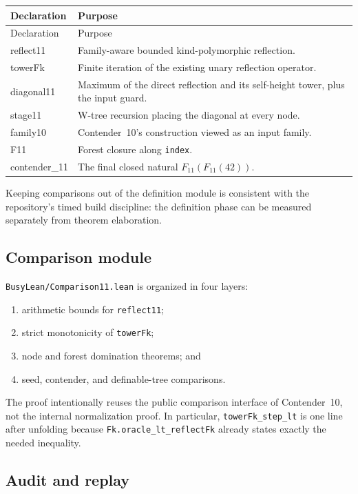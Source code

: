 \documentclass[11pt]{article}
\theoremstyle{definition}
\theoremstyle{remark}
\newcommand{\code}[1]{\texttt{#1}}
\begin{document}
\begin{longtable}{>{\ttfamily}p{} p{}}
\toprule
\normalfont Declaration & Purpose \\
\midrule
\endfirsthead
\toprule
\normalfont Declaration & Purpose \\
\midrule
\endhead
reflect11 & Family-aware bounded kind-polymorphic reflection. \\
towerFk & Finite iteration of the existing unary reflection operator. \\
diagonal11 & Maximum of the direct reflection and its self-height tower, plus the input guard. \\
stage11 & W-tree recursion placing the diagonal at every node. \\
family10 & Contender~10's construction viewed as an input family. \\
F11 & Forest closure along \code{index}. \\
contender\_11 & The final closed natural $F_{11}(F_{11}(42))$. \\
\bottomrule
\end{longtable}

Keeping comparisons out of the definition module is consistent with the
repository's timed build discipline: the definition phase can be measured
separately from theorem elaboration.

\subsection{Comparison module}

\code{BusyLean/Comparison11.lean} is organized in four layers:

\begin{enumerate}[leftmargin=*]
\item arithmetic bounds for \code{reflect11};
\item strict monotonicity of \code{towerFk};
\item node and forest domination theorems; and
\item seed, contender, and definable-tree comparisons.
\end{enumerate}

The proof intentionally reuses the public comparison interface of Contender~10,
not the internal normalization proof. In particular,
\code{towerFk\_step\_lt} is one line after unfolding because
\code{Fk.oracle\_lt\_reflectFk} already states exactly the needed inequality.

\subsection{Audit and replay}
\end{document}

